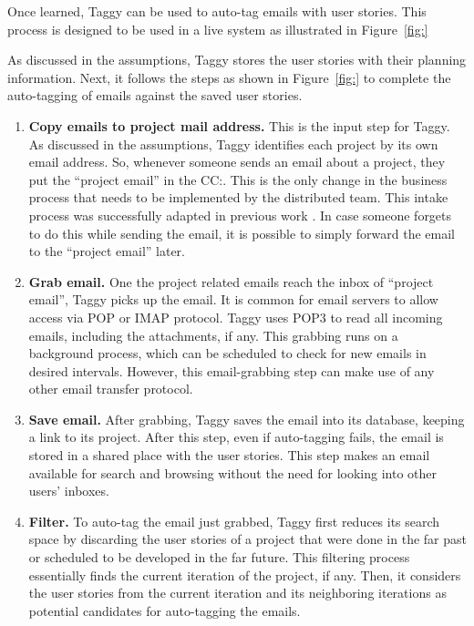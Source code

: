 Once learned, Taggy can be used to auto-tag emails with user stories. This process is designed to be used in a live system as illustrated in Figure~\ref{fig:}

As discussed in the assumptions, Taggy stores the user stories with their planning information. Next, it follows the steps as shown in Figure~\ref{fig:} to complete the auto-tagging of emails against the saved user stories.

\begin{enumerate}
	\item \textbf{Copy emails to project mail address.} This is the input step for Taggy. As discussed in the assumptions, Taggy identifies each project by its own email address. So, whenever someone sends an email about a project, they put the ``project email'' in the CC:. This is the only change in the business process that needs to be implemented by the distributed team. This intake process was successfully adapted in previous work \cite{where_did_you}. In case someone forgets to do this while sending the email, it is possible to simply forward the email to the ``project email'' later.
	
	\item \textbf{Grab email.} One the project related emails reach the inbox of ``project email'', Taggy picks up the email. It is common for email servers to allow access via POP or IMAP protocol. Taggy uses POP3 to read all incoming emails, including the attachments, if any. This grabbing runs on a background process, which can be scheduled to check for new emails in desired intervals. However, this email-grabbing step can make use of any other email transfer protocol.

	\item \textbf{Save email.} After grabbing, Taggy saves the email into its database, keeping a link to its project. After this step, even if auto-tagging fails, the email is stored in a shared place with the user stories. This step makes an email available for search and browsing without the need for looking into other users' inboxes.
	
	\item \textbf{Filter.} To auto-tag the email just grabbed, Taggy first reduces its search space by discarding the user stories of a project that were done in the far past or scheduled to be developed in the far future. This filtering process essentially finds the current iteration of the project, if any. Then, it considers the user stories from the current iteration and its neighboring iterations as potential candidates for auto-tagging the emails.


\end{enumerate}
